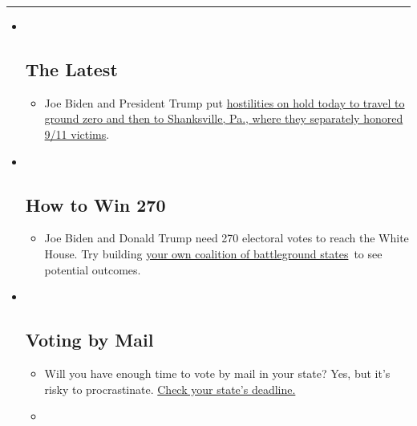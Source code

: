 \begin{center}\rule{0.5\linewidth}{\linethickness}\end{center}

\begin{itemize}
\item ~
  \hypertarget{the-latest}{%
  \subsection{The Latest}\label{the-latest}}

  \begin{itemize}
  \item
    Joe Biden and President Trump put
    \href{https://www.nytimes3xbfgragh.onion/2020/09/11/us/politics/shanksville-trump-biden.html?action=click\&pgtype=Article\&state=default\&region=BELOW_MAIN_CONTENT\&context=storylines_guide}{hostilities
    on hold today to travel to ground zero and then to Shanksville, Pa.,
    where they separately honored 9/11 victims}.
  \end{itemize}
\item ~
  \hypertarget{how-to-win-270}{%
  \subsection{How to Win 270}\label{how-to-win-270}}

  \begin{itemize}
  \item
    Joe Biden and Donald Trump need 270 electoral votes to reach the
    White House. Try building
    \href{https://www.nytimes3xbfgragh.onion/interactive/2020/us/elections/election-states-biden-trump.html?action=click\&pgtype=Article\&state=default\&region=BELOW_MAIN_CONTENT\&context=storylines_guide}{your
    own coalition of battleground states}~to see potential outcomes.
  \end{itemize}
\item ~
  \hypertarget{voting-by-mail}{%
  \subsection{Voting by Mail}\label{voting-by-mail}}

  \begin{itemize}
  \item
    Will you have enough time to vote by mail in your state? Yes, but
    it's risky to procrastinate.
    \href{https://www.nytimes3xbfgragh.onion/interactive/2020/08/31/us/politics/vote-by-mail-deadlines.html?action=click\&pgtype=Article\&state=default\&region=BELOW_MAIN_CONTENT\&context=storylines_guide}{Check
    your state's deadline.}
  \item
    \href{https://www.nytimes3xbfgragh.onion/interactive/2020/us/elections/joe-biden.html?action=click\&pgtype=Article\&state=default\&region=BELOW_MAIN_CONTENT\&context=storylines_guide}{}


\end{itemize}
\end{itemize}
